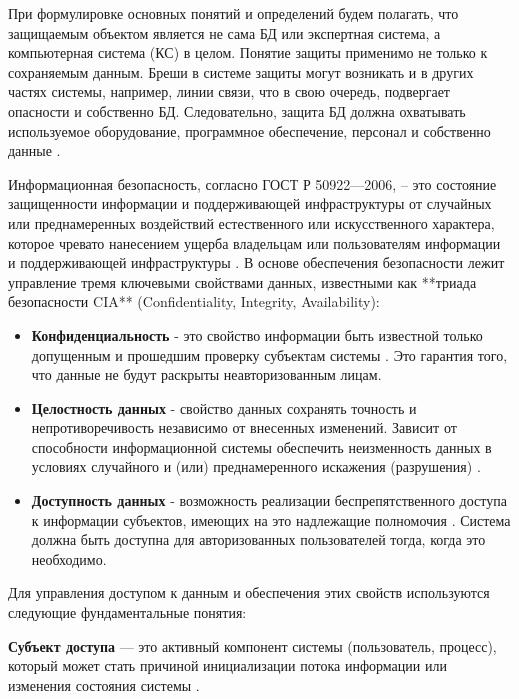 При формулировке основных понятий и определений будем полагать, что защищаемым объектом является не сама БД или экспертная система, а компьютерная система (КС) в целом. Понятие защиты применимо не только к сохраняемым данным. Бреши в системе защиты могут возникать и в других частях системы, например, линии связи, что в свою очередь, подвергает опасности и собственно БД. Следовательно, защита БД должна охватывать используемое оборудование, программное обеспечение, персонал и собственно данные \autocite[сс. 15-18]{Skakun}. 

Информационная безопасность, согласно ГОСТ Р 50922—2006, – это состояние защищенности информации и поддерживающей инфраструктуры от случайных или преднамеренных воздействий естественного или искусственного характера, которое чревато нанесением ущерба владельцам или пользователям информации и поддерживающей инфраструктуры \autocite{GOST50922}. В основе обеспечения безопасности лежит управление тремя ключевыми свойствами данных, известными как **триада безопасности CIA** (Confidentiality, Integrity, Availability):

\begin{itemize}
    \item \textbf{Конфиденциальность} - это свойство информации быть известной только допущенным и прошедшим проверку субъектам системы \autocite[сс. 15-18]{Skakun}. Это гарантия того, что данные не будут раскрыты неавторизованным лицам.
    \item \textbf{Целостность данных} - свойство данных сохранять точность и непротиворечивость независимо от внесенных изменений. Зависит от способности информационной системы обеспечить неизменность данных в условиях случайного и (или) преднамеренного искажения (разрушения) \autocite[сс. 15-18]{Skakun}.
    \item \textbf{Доступность данных} - возможность реализации беспрепятственного доступа к информации субъектов, имеющих на это надлежащие полномочия \autocite[сс. 15-18]{Skakun}. Система должна быть доступна для авторизованных пользователей тогда, когда это необходимо.
\end{itemize}

Для управления доступом к данным и обеспечения этих свойств используются следующие фундаментальные понятия:

\textbf{Субъект доступа} — это активный компонент системы (пользователь, процесс), который может стать причиной инициализации потока информации или изменения состояния системы \autocite[сс. 15-18]{Skakun}. 

